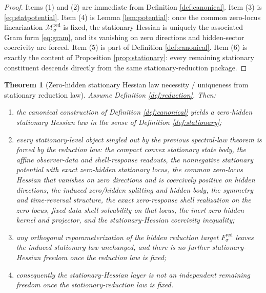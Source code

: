 \documentclass[11pt]{article}
\newcommand{\RedTarget}[1]{F_{#1}^{\mathrm{red}}}
\newcommand{\RedLin}[1]{\mathcal M_{#1}^{\mathrm{red}}}
\newtheorem{theorem}{Theorem}
\begin{document}
\begin{proof}
Items (1) and (2) are immediate from Definition \ref{def:canonical}. Item (3) is \eqref{eq:statpotential}. Item (4) is Lemma \ref{lem:potential}: once the common zero-locus linearization \(\RedLin{\sigma}\) is fixed, the stationary Hessian is uniquely the associated Gram form \eqref{eq:gram}, and its vanishing on zero directions and hidden-sector coercivity are forced. Item (5) is part of Definition \ref{def:canonical}. Item (6) is exactly the content of Proposition \ref{prop:stationary}: every remaining stationary constituent descends directly from the same stationary-reduction package.
\end{proof}

\begin{theorem}[Zero-hidden stationary Hessian law necessity / uniqueness from stationary reduction law]
\label{thm:necessity}
Assume Definition \ref{def:reduction}. Then:
\begin{enumerate}
    \item the canonical construction of Definition \ref{def:canonical} yields a zero-hidden stationary Hessian law in the sense of Definition \ref{def:stationary};
    \item every stationary-level object singled out by the previous spectral-law theorem is forced by the reduction law: the compact convex stationary state body, the affine observer-data and shell-response readouts, the nonnegative stationary potential with exact zero-hidden stationary locus, the common zero-locus Hessian that vanishes on zero directions and is coercively positive on hidden directions, the induced zero/hidden splitting and hidden body, the symmetry and time-reversal structure, the exact zero-response shell realization on the zero locus, fixed-data shell solvability on that locus, the inert zero-hidden kernel and projector, and the stationary-Hessian coercivity inequality;
    \item any orthogonal reparameterization of the hidden reduction target \(\RedTarget{\sigma}\) leaves the induced stationary law unchanged, and there is no further stationary-Hessian freedom once the reduction law is fixed;
    \item consequently the stationary-Hessian layer is not an independent remaining freedom once the stationary-reduction law is fixed.
\end{enumerate}
\end{theorem}
\end{document}
